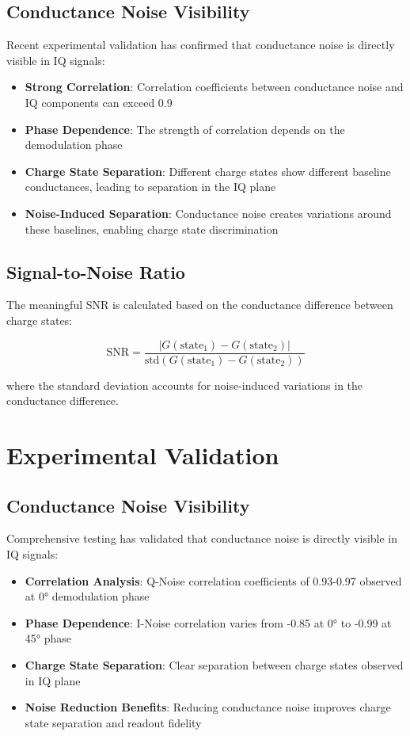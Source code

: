 \documentclass{article}
\begin{document}
\subsection{Conductance Noise Visibility}

Recent experimental validation has confirmed that conductance noise is directly visible in IQ signals:

\begin{itemize}
\item \textbf{Strong Correlation}: Correlation coefficients between conductance noise and IQ components can exceed 0.9
\item \textbf{Phase Dependence}: The strength of correlation depends on the demodulation phase
\item \textbf{Charge State Separation}: Different charge states show different baseline conductances, leading to separation in the IQ plane
\item \textbf{Noise-Induced Separation}: Conductance noise creates variations around these baselines, enabling charge state discrimination
\end{itemize}

\subsection{Signal-to-Noise Ratio}

The meaningful SNR is calculated based on the conductance difference between charge states:

\begin{equation}
\text{SNR} = \frac{|G(\text{state}_1) - G(\text{state}_2)|}{\text{std}(G(\text{state}_1) - G(\text{state}_2))}
\end{equation}

where the standard deviation accounts for noise-induced variations in the conductance difference.

\section{Experimental Validation}

\subsection{Conductance Noise Visibility}

Comprehensive testing has validated that conductance noise is directly visible in IQ signals:

\begin{itemize}
\item \textbf{Correlation Analysis}: Q-Noise correlation coefficients of 0.93-0.97 observed at 0° demodulation phase
\item \textbf{Phase Dependence}: I-Noise correlation varies from -0.85 at 0° to -0.99 at 45° phase
\item \textbf{Charge State Separation}: Clear separation between charge states observed in IQ plane
\item \textbf{Noise Reduction Benefits}: Reducing conductance noise improves charge state separation and readout fidelity
\end{itemize}
\end{document}
